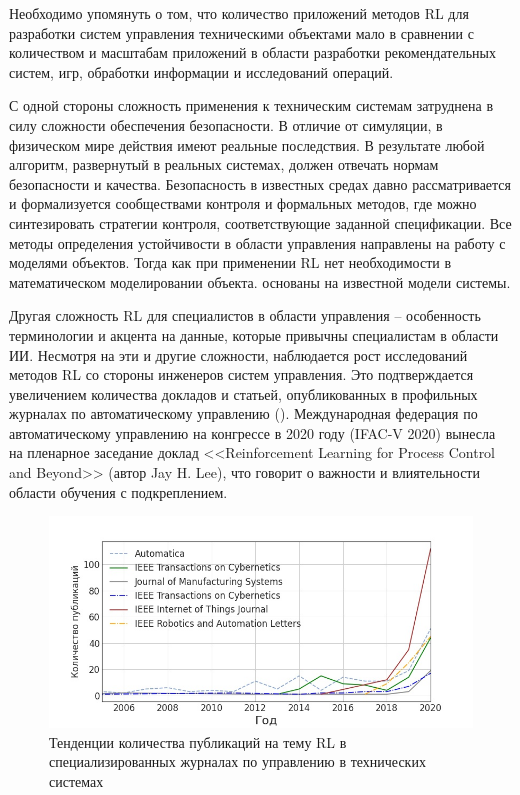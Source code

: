 Необходимо упомянуть о том, что количество приложений методов RL для разработки систем управления техническими объектами мало в сравнении с количеством и масштабам приложений в области разработки рекомендательных систем, игр, обработки информации и исследований операций.

С одной стороны сложность применения к техническим системам затруднена в силу сложности обеспечения безопасности. В отличие от симуляции, в физическом мире действия имеют реальные последствия. В результате любой алгоритм, развернутый в реальных системах, должен отвечать нормам безопасности и качества. Безопасность в известных средах давно рассматривается и формализуется сообществами контроля и формальных методов, где можно синтезировать стратегии контроля, соответствующие заданной спецификации. Все методы определения устойчивости в области управления направлены на работу с моделями объектов. Тогда как при применении RL нет необходимости в математическом моделировании объекта.  основаны на известной модели системы.

Другая сложность RL для специалистов в области управления -- особенность терминологии и акцента на данные, которые привычны специалистам в области ИИ. Несмотря на эти и другие сложности, наблюдается рост исследований методов RL со стороны инженеров систем управления. Это подтверждается увеличением количества докладов и статьей, опубликованных в профильных журналах по автоматическому управлению (). Международная федерация по автоматическому управлению на конгрессе в 2020 году (IFAC-V 2020) вынесла на пленарное заседание доклад <<Reinforcement Learning for Process Control and Beyond>> (автор Jay H. Lee), что говорит о важности и влиятельности области обучения с подкреплением.
%
\begin{figure}[htb!] 
	\center
	\includegraphics [scale=0.5] {my_folder/figure/schema/1.jpg}
	\caption{Тенденции количества публикаций на тему RL в специализированных журналах по управлению в технических системах} 
	\label{fig:pop-ch1}  
\end{figure}

